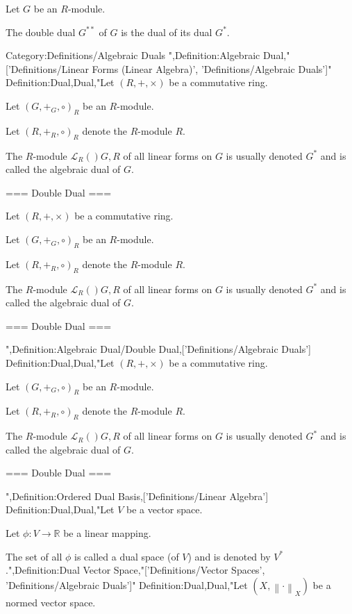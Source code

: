Let $G$ be an $R$-module.


The double dual $G^{**}$ of $G$ is the dual of its dual $G^*$.


Category:Definitions/Algebraic Duals
",Definition:Algebraic Dual,"['Definitions/Linear Forms (Linear Algebra)', 'Definitions/Algebraic Duals']"
Definition:Dual,Dual,"Let $\left( R, +, \times \right)$ be a commutative ring.

Let $\left( G, +_G, \circ \right)_R$ be an $R$-module.

Let $\left( R, +_R, \circ \right)_R$ denote the $R$-module $R$.


The $R$-module $\mathcal L_R \left(   \right){G, R}$ of all linear forms on $G$ is usually denoted $G^*$ and is called the algebraic dual of $G$.


=== Double Dual ===

Let $\left( R, +, \times \right)$ be a commutative ring.

Let $\left( G, +_G, \circ \right)_R$ be an $R$-module.

Let $\left( R, +_R, \circ \right)_R$ denote the $R$-module $R$.


The $R$-module $\mathcal L_R \left(   \right){G, R}$ of all linear forms on $G$ is usually denoted $G^*$ and is called the algebraic dual of $G$.


=== Double Dual ===

",Definition:Algebraic Dual/Double Dual,['Definitions/Algebraic Duals']
Definition:Dual,Dual,"Let $\left( R, +, \times \right)$ be a commutative ring.

Let $\left( G, +_G, \circ \right)_R$ be an $R$-module.

Let $\left( R, +_R, \circ \right)_R$ denote the $R$-module $R$.


The $R$-module $\mathcal L_R \left(   \right){G, R}$ of all linear forms on $G$ is usually denoted $G^*$ and is called the algebraic dual of $G$.


=== Double Dual ===

",Definition:Ordered Dual Basis,['Definitions/Linear Algebra']
Definition:Dual,Dual,"Let $V$ be a vector space.

Let $\phi: V \to \mathbb R$ be a linear mapping.


The set of all $\phi$ is called a dual space (of $V$) and is denoted by $V^*$.",Definition:Dual Vector Space,"['Definitions/Vector Spaces', 'Definitions/Algebraic Duals']"
Definition:Dual,Dual,"Let $\left( X, \left\lVert \cdot \right\rVert_X \right)$ be a normed vector space.

